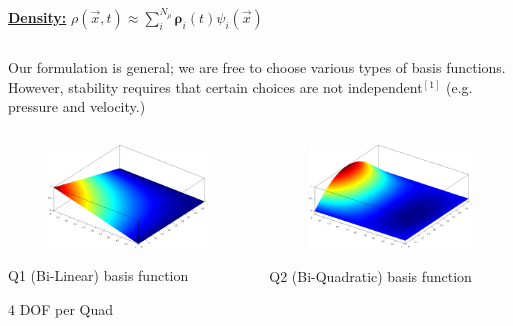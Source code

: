 \documentclass[8pt,xcolor=svgnames]{beamer}
\begin{document}
\begin{frame}
\begin{columns}
\begin{column}{0.5\textwidth}
  \textbf{\underline{Density:}} $\rho(\vec{x},t)\approx \displaystyle\sum_i^{N_{\rho}} \mathbf{\rho}_i(t) \psi_i(\vec{x})$
 \end{column}
\end{columns}
Our formulation is general; we are free to choose various types of basis functions. However, stability
requires that certain choices are not independent$^{[1]}$ (e.g. pressure and velocity.)
\begin{columns}
 \begin{column}{0.3\textwidth}
  \begin{figure}[h!]
    \centering
    \includegraphics[width=1.0\textwidth,keepaspectratio=true]{./Images/Q1Basis.png}
    \end{figure}
    \centering
    \small{Q1 (Bi-Linear) basis function

    4 DOF per Quad}
 \end{column}
 \begin{column}{0.3\textwidth}
  \begin{figure}[h!]
    \centering
    \includegraphics[width=1.0\textwidth,keepaspectratio=true]{./Images/Q2Basis.png}
    \end{figure}
    \centering
    \small{Q2 (Bi-Quadratic) basis function

}
\end{column}
\end{columns}
\end{frame}
\end{document}
